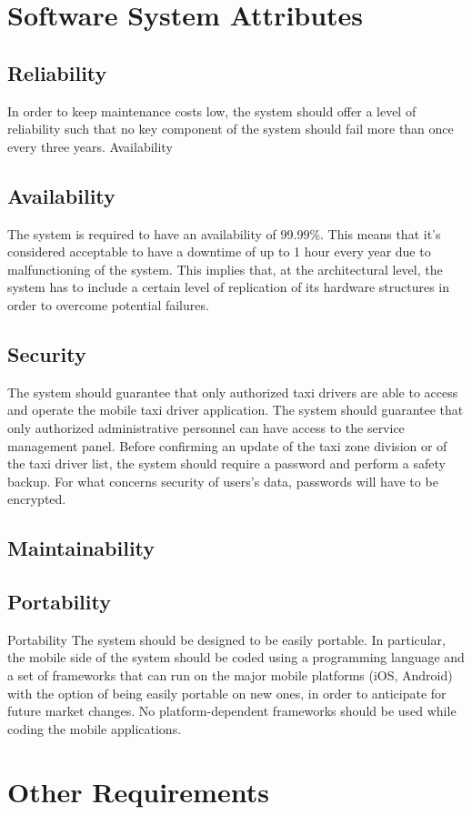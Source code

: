 \section{Software System Attributes}
\subsection{Reliability}
In order to keep maintenance costs low, the system should offer a level of reliability such that no key component of the system should fail more than once every three years.
Availability
\subsection{Availability}
The system is required to have an availability of 99.99\%. This means that it’s considered acceptable to have a downtime of up to 1 hour every year due to malfunctioning of the system. This implies that, at the architectural level, the system has to include a certain level of replication of its hardware structures in order to overcome potential failures. 
\subsection{Security}
The system should guarantee that only authorized taxi drivers are able to access and operate the mobile taxi driver application. 
The system should guarantee that only authorized administrative personnel can have access to the service management panel. Before confirming an update of the taxi zone division or of the taxi driver list, the system should require a password and perform a safety backup.
For what concerns security of users’s data, passwords will have to be encrypted. 
\subsection{Maintainability}
\subsection{Portability}
Portability
The system should be designed to be easily portable. In particular, the mobile side of the system should be coded using a programming language and a set of frameworks that can run on the major mobile platforms (iOS, Android) with the option of being easily portable on new ones, in order to anticipate for future market changes. No platform-dependent frameworks should be used while coding the mobile applications.
\section{Other Requirements}




